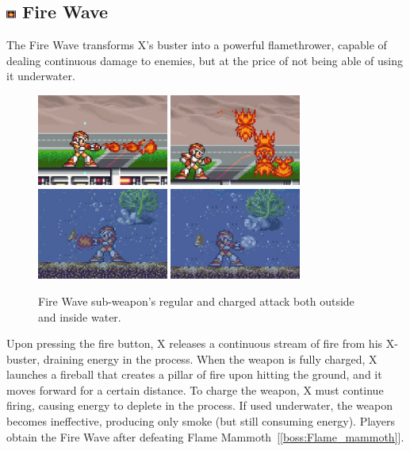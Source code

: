 \subsection{\includegraphics[width=12px, height=10px]{figures/X1/weapons/F_wave.jpg} Fire Wave}\label{Fire_wave}
The Fire Wave transforms X's buster into a powerful flamethrower, capable of dealing continuous damage to enemies, but at the price of not being able of using it underwater.\begin{figure}[htp]
	\centering
	\includegraphics[height=3cm]{figures/X1/weapons/Fire_wave_1.png}
	\includegraphics[height=3cm]{figures/X1/weapons/Fire_wave_3.png}
	\includegraphics[height=3cm]{figures/X1/weapons/Fire_wave_2.png}
	\includegraphics[height=3cm]{figures/X1/weapons/Fire_wave_4.jpg}
	\caption{Fire Wave sub-weapon's regular and charged attack both outside and inside water.}
\end{figure} Upon pressing the fire button, X releases a continuous stream of fire from his X-buster, draining energy in the process. When the weapon is fully charged, X launches a fireball that creates a pillar of fire upon hitting the ground, and it moves forward for a certain distance.
 To charge the weapon, X must continue firing, causing energy to deplete in the process. If used underwater, the weapon becomes ineffective, producing only smoke (but still consuming energy). Players obtain the Fire Wave after defeating Flame Mammoth~[\ref{boss:Flame_mammoth}].



